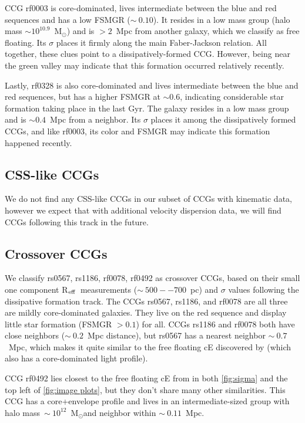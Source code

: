 \documentclass[iop,apj]{emulateapj}
\newcommand{\Reff}{R$_{\rm eff}$}
\newcommand{\Msun}{M$_{\odot}$}
\begin{document}
CCG rf0003 is core-dominated, lives intermediate between the blue and red sequences and has a low FSMGR ($\sim~0.10$). It resides in a low mass group (halo mass $\sim10^{10.9}$~\Msun) and is $>2$~Mpc from another galaxy, which we classify as free floating. Its $\sigma$ places it firmly along the main Faber-Jackson relation. All together, these clues point to a dissipatively-formed CCG. However, being near the green valley may indicate that this formation occurred relatively recently.

Lastly, rf0328 is also core-dominated and lives intermediate between the blue and red sequences, but has a higher FSMGR at $\sim0.6$, indicating considerable star formation taking place in the last Gyr. The galaxy resides in a low mass group and is $\sim0.4$~Mpc from a neighbor. Its $\sigma$ places it among the dissipatively formed CCGs, and like rf0003, its color and FSMGR may indicate this formation happened recently.

\subsection{CSS-like CCGs}
We do not find any CSS-like CCGs in our subset of CCGs with kinematic data, however we expect that with additional velocity dispersion data, we will find CCGs following this track in the future.

\subsection{Crossover CCGs}
We classify rs0567, rs1186, rf0078, rf0492 as crossover CCGs, based on their small one component \Reff\ measurements ($\sim~500--700$~pc) and $\sigma$ values following the dissipative formation track. The CCGs rs0567, rs1186, and rf0078 are all three are mildly core-dominated galaxies. They live on the red sequence and display little star formation (FSMGR $> 0.1$) for all. CCGs rs1186 and rf0078 both have close neighbors ($\sim~0.2$~Mpc distance), but rs0567 has a nearest neighbor $\sim~0.7$~Mpc, which makes it quite similar to the free floating cE discovered by \citet{Huxor2013} (which also has a core-dominated light profile).

CCG rf0492 lies closest to the free floating cE from \citet{Huxor2013} in both \autoref{fig:sigma} and the top left of \autoref{fig:image plots}, but they don't share many other similarities. This CCG has a core+envelope profile and lives in an intermediate-sized group with halo mass~$\sim~10^{12}$~\Msun and neighbor within $\sim~0.11$~Mpc. 
\end{document}
